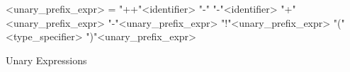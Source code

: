 \begin{Grammar}
 \begin{grammar}

    <unary\_prefix\_expr> = "++"<identifier>
     \alt	"-" "-"<identifier>			
     \alt	"+"<unary\_prefix\_expr>						
     \alt	"-"<unary\_prefix\_expr>
     \alt "!"<unary\_prefix\_expr>
     \alt "(" <type\_specifier> ")"<unary\_prefix\_expr>
  
 \end{grammar}
 \caption{Unary Expressions}\label{gra:unary}
\end{Grammar}


